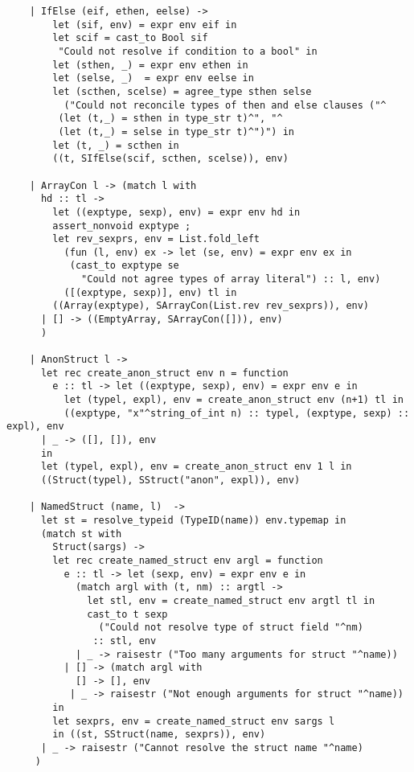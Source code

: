 \documentclass[main.tex]{subfiles}
\begin{document}
\begin{lstlisting}
    | IfElse (eif, ethen, eelse) -> 
        let (sif, env) = expr env eif in
        let scif = cast_to Bool sif
         "Could not resolve if condition to a bool" in
        let (sthen, _) = expr env ethen in
        let (selse, _)  = expr env eelse in
        let (scthen, scelse) = agree_type sthen selse
          ("Could not reconcile types of then and else clauses ("^
         (let (t,_) = sthen in type_str t)^", "^
         (let (t,_) = selse in type_str t)^")") in
        let (t, _) = scthen in
        ((t, SIfElse(scif, scthen, scelse)), env)

    | ArrayCon l -> (match l with
      hd :: tl ->
        let ((exptype, sexp), env) = expr env hd in 
        assert_nonvoid exptype ;
        let rev_sexprs, env = List.fold_left 
          (fun (l, env) ex -> let (se, env) = expr env ex in
           (cast_to exptype se
             "Could not agree types of array literal") :: l, env)
          ([(exptype, sexp)], env) tl in
        ((Array(exptype), SArrayCon(List.rev rev_sexprs)), env)
      | [] -> ((EmptyArray, SArrayCon([])), env) 
      )

    | AnonStruct l -> 
      let rec create_anon_struct env n = function
        e :: tl -> let ((exptype, sexp), env) = expr env e in
          let (typel, expl), env = create_anon_struct env (n+1) tl in
          ((exptype, "x"^string_of_int n) :: typel, (exptype, sexp) :: expl), env
      | _ -> ([], []), env
      in
      let (typel, expl), env = create_anon_struct env 1 l in
      ((Struct(typel), SStruct("anon", expl)), env)

    | NamedStruct (name, l)  ->
      let st = resolve_typeid (TypeID(name)) env.typemap in
      (match st with
        Struct(sargs) -> 
        let rec create_named_struct env argl = function
          e :: tl -> let (sexp, env) = expr env e in
            (match argl with (t, nm) :: argtl ->
              let stl, env = create_named_struct env argtl tl in
              cast_to t sexp
                ("Could not resolve type of struct field "^nm)
               :: stl, env
            | _ -> raisestr ("Too many arguments for struct "^name))
          | [] -> (match argl with
            [] -> [], env
           | _ -> raisestr ("Not enough arguments for struct "^name))
        in
        let sexprs, env = create_named_struct env sargs l
        in ((st, SStruct(name, sexprs)), env)
      | _ -> raisestr ("Cannot resolve the struct name "^name)
     )


\end{lstlisting}
\end{document}
